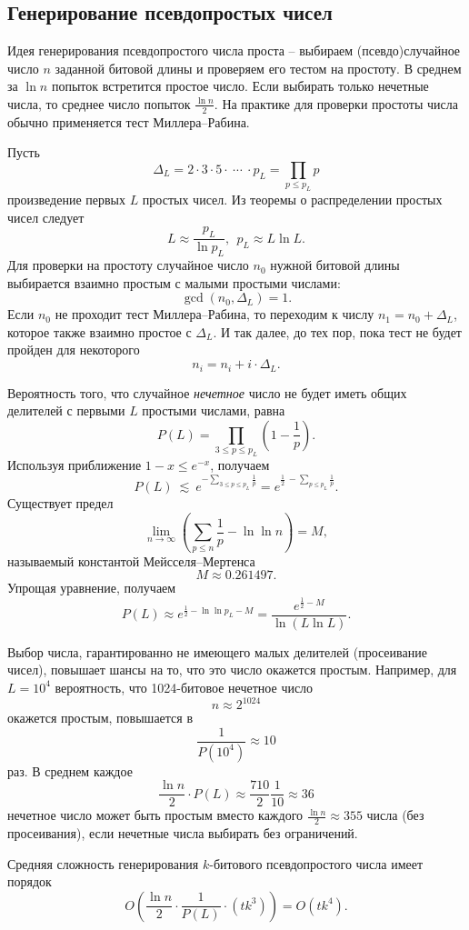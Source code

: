 \subsection{Генерирование псевдопростых чисел}

Идея генерирования псевдопростого числа проста -- выбираем (псевдо)случайное число $n$ заданной битовой длины и проверяем его тестом на простоту. В среднем за $\ln n$ попыток встретится простое число. Если выбирать только нечетные числа, то среднее число попыток $\frac{\ln n}{2}$. На практике для проверки простоты числа обычно применяется тест Миллера--Рабина.

Пусть
    \[ \Delta_L = 2 \cdot 3 \cdot 5 \cdot ~\cdots~ \cdot p_L = \prod \limits_{p \leq p_L} p \]
произведение первых $L$ простых чисел. Из теоремы о распределении простых чисел следует
    \[ L \approx \frac{p_L}{\ln p_L}, ~~ p_L \approx L \ln L. \]
Для проверки на простоту случайное число $n_0$ нужной битовой длины выбирается взаимно простым с малыми простыми числами:
    \[ \gcd(n_0, \Delta_L) = 1. \]
Если $n_0$ не проходит тест Миллера--Рабина, то переходим к числу $n_1 = n_0 + \Delta_L$, которое также взаимно простое с $\Delta_L$. И так далее, до тех пор, пока тест не будет пройден  для некоторого
    \[ n_i = n_i + i \cdot \Delta_L. \]

Вероятность того, что случайное \textit{нечетное} число не будет иметь общих делителей с первыми $L$ простыми числами, равна
    \[ P(L) = \prod \limits_{3 \leq p \leq p_L} \left( 1 - \frac{1}{p} \right). \]
Используя приближение $1-x \leq e^{-x}$, получаем
    \[ P(L) ~\lesssim~ e^{-\sum\limits_{3 \leq p \leq p_L} \frac{1}{p}} = e^{\frac{1}{2} ~ - \sum\limits_{p \leq p_L} \frac{1}{p}}. \]
Существует предел
    \[ \lim \limits_{n \rightarrow \infty} \left( \sum \limits_{p \leq n} \frac{1}{p} - \ln \ln n \right) = M, \]
называемый константой Мейсселя--Мертенса
    \[ M \approx 0.261497. \]
Упрощая уравнение, получаем
    \[ P(L) \approx e^{\frac{1}{2} - \ln \ln p_L - M} = \frac{e^{\frac{1}{2} - M}}{\ln(L \ln L)}. \]

Выбор числа, гарантированно не имеющего малых делителей (просеивание чисел), повышает шансы на то, что это число окажется простым. Например, для $L = 10^4$ вероятность, что 1024-битовое нечетное число
    \[ n \approx 2^{1024} \]
окажется простым, повышается в
    \[ \frac{1}{P(10^4)} \approx 10 \]
раз. В среднем каждое
    \[ \frac{\ln n}{2} \cdot P(L) \approx \frac{710}{2} \frac{1}{10} \approx 36 \]
нечетное число может быть простым вместо каждого $\frac{\ln n}{2} \approx 355$ числа (без просеивания), если нечетные числа выбирать без ограничений.

Средняя сложность генерирования $k$-битового псевдопростого числа имеет порядок
    \[ O \left( \frac{\ln n}{2} \cdot \frac{1}{P(L)} \cdot \left( t k^3 \right) \right) = O(t k^4). \]
